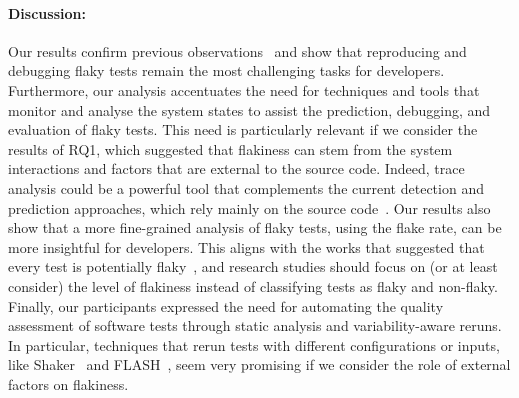 \paragraph{\textbf{Discussion:}}
Our results confirm previous observations~\cite{Eck2019,Lam2019RootCausing,Lam2020} and show that reproducing and debugging flaky tests remain the most challenging tasks for developers.
Furthermore, our analysis accentuates the need for techniques and tools that monitor and analyse the system states to assist the prediction, debugging, and evaluation of flaky tests.
This need is particularly relevant if we consider the results of \textsc{RQ1}, which suggested that flakiness can stem from the system interactions and factors that are external to the source code.
Indeed, trace analysis could be a powerful tool that complements the current detection and prediction approaches, which rely mainly on the source code~\cite{Bell2018,Lam2019iDFlakies,Pinto2020,King2018,Bertolino2020}.
Our results also show that a more fine-grained analysis of flaky tests, using the flake rate, can be more insightful for developers. 
This aligns with the works that suggested that every test is potentially flaky~\cite{Harman2018}, and research studies should focus on (or at least consider) the level of flakiness instead of classifying tests as flaky and non-flaky.
Finally, our participants expressed the need for automating the quality assessment of software tests through static analysis and variability-aware reruns.
In particular, techniques that rerun tests with different configurations or inputs, like Shaker~\cite{Silva2020} and FLASH~\cite{Dutta2020}, seem very promising if we consider the role of external factors on flakiness.